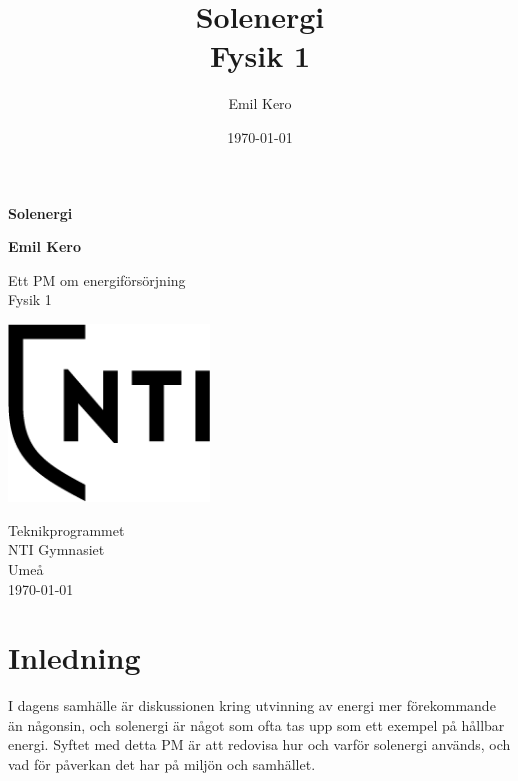 \documentclass[11p]{article}
\title{Solenergi \\ \small Fysik 1}
\author{Emil Kero }
\date{\today}
\begin{document}
    \begin{titlepage}
        \begin{center}
            \vspace*{1cm}

            \Huge
            \textbf{Solenergi}

            \vspace{0.5cm}
            \LARGE


            \vspace{1.5cm}

            \textbf{Emil Kero}

            \vfill

            Ett PM om energiförsörjning \\
            Fysik 1

            \vspace{0.8cm}

            \includegraphics[width=0.4\textwidth]{../src/NTI Gymnasiet_Symbol_print_svart.png}

            \Large
            Teknikprogrammet\\
            NTI Gymnasiet\\
            Umeå\\
            \today

        \end{center}
    \end{titlepage}
    \tableofcontents
    \newpage

    \section{Inledning}
    I dagens samhälle är diskussionen kring utvinning av energi mer förekommande än någonsin, och solenergi är något som ofta tas upp som ett exempel på hållbar energi.
    \newline Syftet med detta PM är att redovisa hur och varför solenergi används, och vad för påverkan det har på miljön och samhället.
\end{document}
